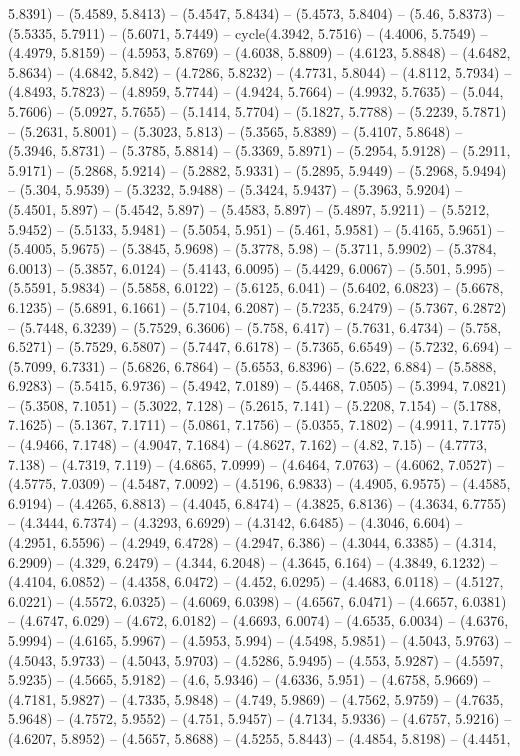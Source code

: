 5.8391) -- (5.4589, 5.8413) -- (5.4547, 5.8434) -- (5.4573, 5.8404) -- (5.46, 5.8373) -- (5.5335, 5.7911) -- (5.6071, 5.7449) -- cycle(4.3942, 5.7516) -- (4.4006, 5.7549) -- (4.4979, 5.8159) -- (4.5953, 5.8769) -- (4.6038, 5.8809) -- (4.6123, 5.8848) -- (4.6482, 5.8634) -- (4.6842, 5.842) -- (4.7286, 5.8232) -- (4.7731, 5.8044) -- (4.8112, 5.7934) -- (4.8493, 5.7823) -- (4.8959, 5.7744) -- (4.9424, 5.7664) -- (4.9932, 5.7635) -- (5.044, 5.7606) -- (5.0927, 5.7655) -- (5.1414, 5.7704) -- (5.1827, 5.7788) -- (5.2239, 5.7871) -- (5.2631, 5.8001) -- (5.3023, 5.813) -- (5.3565, 5.8389) -- (5.4107, 5.8648) -- (5.3946, 5.8731) -- (5.3785, 5.8814) -- (5.3369, 5.8971) -- (5.2954, 5.9128) -- (5.2911, 5.9171) -- (5.2868, 5.9214) -- (5.2882, 5.9331) -- (5.2895, 5.9449) -- (5.2968, 5.9494) -- (5.304, 5.9539) -- (5.3232, 5.9488) -- (5.3424, 5.9437) -- (5.3963, 5.9204) -- (5.4501, 5.897) -- (5.4542, 5.897) -- (5.4583, 5.897) -- (5.4897, 5.9211) -- (5.5212, 5.9452) -- (5.5133, 5.9481) -- (5.5054, 5.951) -- (5.461, 5.9581) -- (5.4165, 5.9651) -- (5.4005, 5.9675) -- (5.3845, 5.9698) -- (5.3778, 5.98) -- (5.3711, 5.9902) -- (5.3784, 6.0013) -- (5.3857, 6.0124) -- (5.4143, 6.0095) -- (5.4429, 6.0067) -- (5.501, 5.995) -- (5.5591, 5.9834) -- (5.5858, 6.0122) -- (5.6125, 6.041) -- (5.6402, 6.0823) -- (5.6678, 6.1235) -- (5.6891, 6.1661) -- (5.7104, 6.2087) -- (5.7235, 6.2479) -- (5.7367, 6.2872) -- (5.7448, 6.3239) -- (5.7529, 6.3606) -- (5.758, 6.417) -- (5.7631, 6.4734) -- (5.758, 6.5271) -- (5.7529, 6.5807) -- (5.7447, 6.6178) -- (5.7365, 6.6549) -- (5.7232, 6.694) -- (5.7099, 6.7331) -- (5.6826, 6.7864) -- (5.6553, 6.8396) -- (5.622, 6.884) -- (5.5888, 6.9283) -- (5.5415, 6.9736) -- (5.4942, 7.0189) -- (5.4468, 7.0505) -- (5.3994, 7.0821) -- (5.3508, 7.1051) -- (5.3022, 7.128) -- (5.2615, 7.141) -- (5.2208, 7.154) -- (5.1788, 7.1625) -- (5.1367, 7.1711) -- (5.0861, 7.1756) -- (5.0355, 7.1802) -- (4.9911, 7.1775) -- (4.9466, 7.1748) -- (4.9047, 7.1684) -- (4.8627, 7.162) -- (4.82, 7.15) -- (4.7773, 7.138) -- (4.7319, 7.119) -- (4.6865, 7.0999) -- (4.6464, 7.0763) -- (4.6062, 7.0527) -- (4.5775, 7.0309) -- (4.5487, 7.0092) -- (4.5196, 6.9833) -- (4.4905, 6.9575) -- (4.4585, 6.9194) -- (4.4265, 6.8813) -- (4.4045, 6.8474) -- (4.3825, 6.8136) -- (4.3634, 6.7755) -- (4.3444, 6.7374) -- (4.3293, 6.6929) -- (4.3142, 6.6485) -- (4.3046, 6.604) -- (4.2951, 6.5596) -- (4.2949, 6.4728) -- (4.2947, 6.386) -- (4.3044, 6.3385) -- (4.314, 6.2909) -- (4.329, 6.2479) -- (4.344, 6.2048) -- (4.3645, 6.164) -- (4.3849, 6.1232) -- (4.4104, 6.0852) -- (4.4358, 6.0472) -- (4.452, 6.0295) -- (4.4683, 6.0118) -- (4.5127, 6.0221) -- (4.5572, 6.0325) -- (4.6069, 6.0398) -- (4.6567, 6.0471) -- (4.6657, 6.0381) -- (4.6747, 6.029) -- (4.672, 6.0182) -- (4.6693, 6.0074) -- (4.6535, 6.0034) -- (4.6376, 5.9994) -- (4.6165, 5.9967) -- (4.5953, 5.994) -- (4.5498, 5.9851) -- (4.5043, 5.9763) -- (4.5043, 5.9733) -- (4.5043, 5.9703) -- (4.5286, 5.9495) -- (4.553, 5.9287) -- (4.5597, 5.9235) -- (4.5665, 5.9182) -- (4.6, 5.9346) -- (4.6336, 5.951) -- (4.6758, 5.9669) -- (4.7181, 5.9827) -- (4.7335, 5.9848) -- (4.749, 5.9869) -- (4.7562, 5.9759) -- (4.7635, 5.9648) -- (4.7572, 5.9552) -- (4.751, 5.9457) -- (4.7134, 5.9336) -- (4.6757, 5.9216) -- (4.6207, 5.8952) -- (4.5657, 5.8688) -- (4.5255, 5.8443) -- (4.4854, 5.8198) -- (4.4451, 